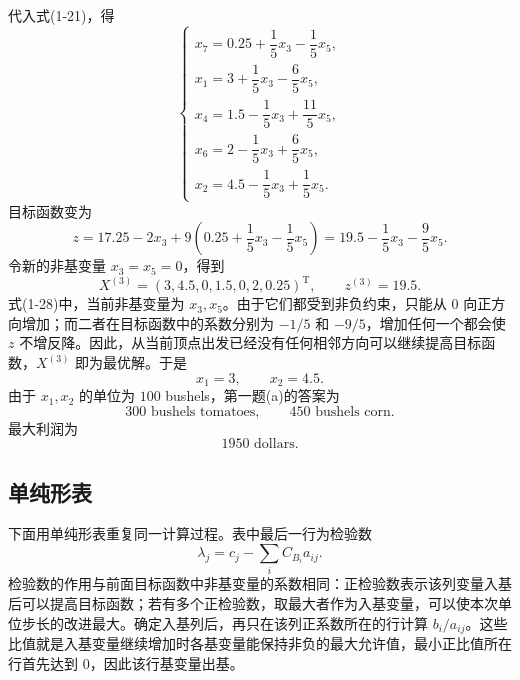 ﻿\documentclass[UTF8,zihao=-4,fontset=none]{ctexart}
\begin{document}
代入式(1-21)，得
\[
    \begin{cases}
    x_7=0.25+\dfrac{1}{5}x_3-\dfrac{1}{5}x_5,\\[0.4em]
    x_1=3+\dfrac{1}{5}x_3-\dfrac{6}{5}x_5,\\[0.4em]
    x_4=1.5-\dfrac{1}{5}x_3+\dfrac{11}{5}x_5,\\[0.4em]
    x_6=2-\dfrac{1}{5}x_3+\dfrac{6}{5}x_5,\\[0.4em]
    x_2=4.5-\dfrac{1}{5}x_3+\dfrac{1}{5}x_5.
    \end{cases} \tag{1-27}
\]
目标函数变为
\[
    z=17.25-2x_3+9\left(0.25+\frac{1}{5}x_3-\frac{1}{5}x_5\right)
     =19.5-\frac{1}{5}x_3-\frac{9}{5}x_5. \tag{1-28}
\]
令新的非基变量 \(x_3=x_5=0\)，得到
\[
    X^{(3)}=(3,4.5,0,1.5,0,2,0.25)^{\mathrm T},\qquad z^{(3)}=19.5. \tag{1-29}
\]
式(1-28)中，当前非基变量为 \(x_3,x_5\)。由于它们都受到非负约束，只能从 \(0\) 向正方向增加；而二者在目标函数中的系数分别为 \(-1/5\) 和 \(-9/5\)，增加任何一个都会使 \(z\) 不增反降。因此，从当前顶点出发已经没有任何相邻方向可以继续提高目标函数，\(X^{(3)}\) 即为最优解。于是
\[
    x_1=3,\qquad x_2=4.5.
\]
由于 \(x_1,x_2\) 的单位为 \(100\) bushels，第一题(a)的答案为
\[
    \boxed{300\text{ bushels tomatoes},\qquad 450\text{ bushels corn}.}
\]
最大利润为
\[
    \boxed{1950\text{ dollars}.}
\]

\subsection{单纯形表}

下面用单纯形表重复同一计算过程。表中最后一行为检验数
\[
    \lambda_j=c_j-\sum_i C_{B_i}a_{ij}.
\]
检验数的作用与前面目标函数中非基变量的系数相同：正检验数表示该列变量入基后可以提高目标函数；若有多个正检验数，取最大者作为入基变量，可以使本次单位步长的改进最大。确定入基列后，再只在该列正系数所在的行计算 \(b_i/a_{ij}\)。这些比值就是入基变量继续增加时各基变量能保持非负的最大允许值，最小正比值所在行首先达到 \(0\)，因此该行基变量出基。
\end{document}
